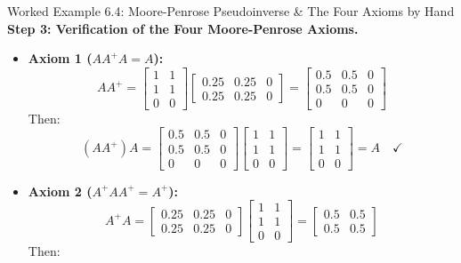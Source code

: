 \begin{examplebox}[breakable]{Worked Example 6.4: Moore-Penrose Pseudoinverse \& The Four Axioms by Hand}
\textbf{Step 3: Verification of the Four Moore-Penrose Axioms.}
\begin{itemize}
    \item \textbf{Axiom 1 ($A A^+ A = A$):}
    \begin{equation}
    A A^+ = \begin{bmatrix} 1 & 1 \\ 1 & 1 \\ 0 & 0 \end{bmatrix} \begin{bmatrix} 0.25 & 0.25 & 0 \\ 0.25 & 0.25 & 0 \end{bmatrix} = \begin{bmatrix} 0.5 & 0.5 & 0 \\ 0.5 & 0.5 & 0 \\ 0 & 0 & 0 \end{bmatrix}
    \end{equation}
    Then:
    \begin{equation}
    (A A^+) A = \begin{bmatrix} 0.5 & 0.5 & 0 \\ 0.5 & 0.5 & 0 \\ 0 & 0 & 0 \end{bmatrix} \begin{bmatrix} 1 & 1 \\ 1 & 1 \\ 0 & 0 \end{bmatrix} = \begin{bmatrix} 1 & 1 \\ 1 & 1 \\ 0 & 0 \end{bmatrix} = A \quad \checkmark
    \end{equation}
    \item \textbf{Axiom 2 ($A^+ A A^+ = A^+$):}
    \begin{equation}
    A^+ A = \begin{bmatrix} 0.25 & 0.25 & 0 \\ 0.25 & 0.25 & 0 \end{bmatrix} \begin{bmatrix} 1 & 1 \\ 1 & 1 \\ 0 & 0 \end{bmatrix} = \begin{bmatrix} 0.5 & 0.5 \\ 0.5 & 0.5 \end{bmatrix}
    \end{equation}
    Then:

\end{itemize}
\end{examplebox}
